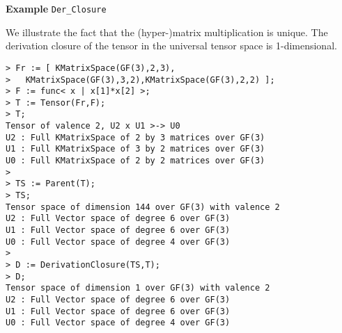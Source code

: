 \begin{framed}{\bf Example} {\tt Der\_Closure}\\
{\small We illustrate the fact that the (hyper-)matrix multiplication is unique. 
The derivation closure of the tensor in the universal tensor space is 1-dimensional.
\begin{lstlisting}[frame=single,basicstyle=\ttfamily\color{black!30!
teal},backgroundcolor=\color{white!70!gray}]
> Fr := [ KMatrixSpace(GF(3),2,3),
>   KMatrixSpace(GF(3),3,2),KMatrixSpace(GF(3),2,2) ];
> F := func< x | x[1]*x[2] >;
> T := Tensor(Fr,F);
> T;
Tensor of valence 2, U2 x U1 >-> U0
U2 : Full KMatrixSpace of 2 by 3 matrices over GF(3)
U1 : Full KMatrixSpace of 3 by 2 matrices over GF(3)
U0 : Full KMatrixSpace of 2 by 2 matrices over GF(3)
> 
> TS := Parent(T);
> TS;
Tensor space of dimension 144 over GF(3) with valence 2
U2 : Full Vector space of degree 6 over GF(3)
U1 : Full Vector space of degree 6 over GF(3)
U0 : Full Vector space of degree 4 over GF(3)
> 
> D := DerivationClosure(TS,T);
> D;
Tensor space of dimension 1 over GF(3) with valence 2
U2 : Full Vector space of degree 6 over GF(3)
U1 : Full Vector space of degree 6 over GF(3)
U0 : Full Vector space of degree 4 over GF(3)
\end{lstlisting} }
\end{framed}

